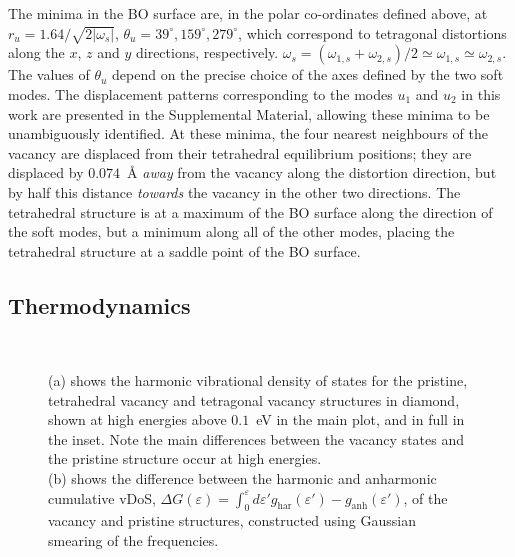 \documentclass[aps,showpacs,prb,reprint,superscriptaddress,longbibliography]{revtex4-1}
\begin{document}
The minima in the BO surface are, in the polar co-ordinates defined
above, at $r_u=1.64/\sqrt{2|\omega_s|}$,
$\theta_u = 39^\circ,159^\circ,279^\circ$, which correspond to
tetragonal distortions along the $x$, $z$ and $y$ directions,
respectively.
$\omega_s=(\omega_{1,s}+\omega_{2,s})/2\simeq\omega_{1,s}\simeq\omega_{2,s}$.
The values of $\theta_u$ depend on the precise choice of the axes
defined by the two soft modes.  The displacement patterns
corresponding to the modes $u_1$ and $u_2$ in this work are presented
in the Supplemental Material, allowing these minima to be
unambiguously identified.  At these minima, the four nearest
neighbours of the vacancy are displaced from their tetrahedral
equilibrium positions; they are displaced by $0.074$~\r{A}
\textit{away} from the vacancy along the distortion direction, but by
half this distance \textit{towards} the vacancy in the other two
directions. The tetrahedral structure is at a maximum of the BO
surface along the direction of the soft modes, but a minimum along all
of the other modes, placing the tetrahedral structure at a saddle
point of the BO surface.

\subsection{Thermodynamics}

\begin{figure}[t!]
\begin{center}
\\
\end{center}
\caption{(a) shows the harmonic vibrational density of states for the pristine,
  tetrahedral vacancy and tetragonal vacancy structures in diamond,
  shown at high energies above $0.1$~eV in the main plot, and in full in the
  inset. Note the main differences between the vacancy states and the
  pristine structure occur at high energies.\\
  (b) shows the difference between the harmonic and anharmonic cumulative vDoS, $\Delta G(\varepsilon)=\int^\varepsilon_0 d\varepsilon' g_{\text{har}}(\varepsilon')-g_{\text{anh}}(\varepsilon')$,
  of the vacancy and pristine structures, constructed
  using Gaussian smearing of the frequencies.
}
\end{figure}
\end{document}
